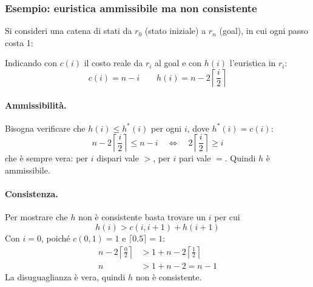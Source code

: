 \documentclass[a4paper, 11pt, oneside]{book}
\theoremstyle{definition}
\begin{document}
    \subsubsection*{Esempio: euristica ammissibile ma non consistente}
    Si consideri una catena di stati da $r_0$ (stato iniziale) a $r_n$ (goal), in cui ogni
    passo costa 1:

    \begin{center}
    \end{center}

    Indicando con $c(i)$ il costo reale da $r_i$ al goal e con $h(i)$ l'euristica in $r_i$:
    \[
        c(i) = n - i \qquad h(i) = n - 2\left\lceil \frac{i}{2} \right\rceil
    \]

    \paragraph{Ammissibilit\`a.} Bisogna verificare che $h(i) \leq h^*(i)$ per ogni $i$, dove
    $h^*(i) = c(i)$:
    \[
        n - 2\left\lceil \frac{i}{2} \right\rceil \leq n - i
        \quad\Longleftrightarrow\quad
        2\left\lceil \frac{i}{2} \right\rceil \geq i
    \]
    che \`e sempre vera: per $i$ dispari vale $>$, per $i$ pari vale $=$. Quindi $h$ \`e
    ammissibile.

    \paragraph{Consistenza.} Per mostrare che $h$ non \`e consistente basta trovare un $i$ per
    cui
    \[
        h(i) > c(i, i+1) + h(i+1)
    \]
    Con $i = 0$, poich\'e $c(0, 1) = 1$ e $\lceil 0.5 \rceil = 1$:
    \begin{align*}
        n - 2\left\lceil \frac{0}{2} \right\rceil &> 1 + n - 2\left\lceil \frac{1}{2} \right\rceil \\
        n &> 1 + n - 2 = n - 1
    \end{align*}
    La disuguaglianza \`e vera, quindi $h$ non \`e consistente.
\end{document}
